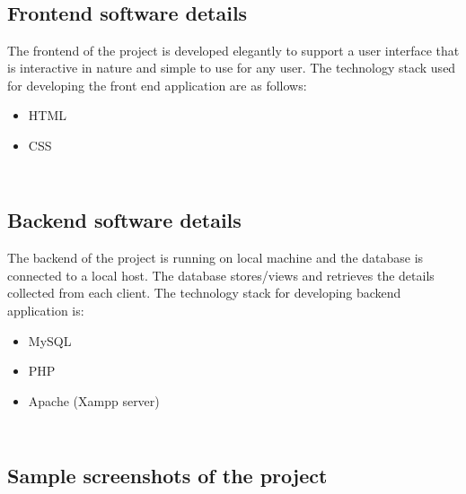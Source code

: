 \documentclass{article}
\begin{document}
\subsection{\\Frontend software details}
The frontend of the project is developed elegantly to support a user interface that is interactive in nature and simple to use for any user.
\newline
The technology stack used for developing the front end application are as follows:
\begin{itemize}
\item HTML
\item CSS
\end{itemize}
\subsection{\\Backend software details}
The backend of the project is running on local machine and the database is connected to a local host. The database  stores/views and retrieves the details collected from each client.
The technology stack for developing backend application is: 
\begin{itemize}
\item MySQL
\item PHP
\item Apache (Xampp server)
\end{itemize}
\subsection{\\Sample screenshots of the project}
\end{document}
